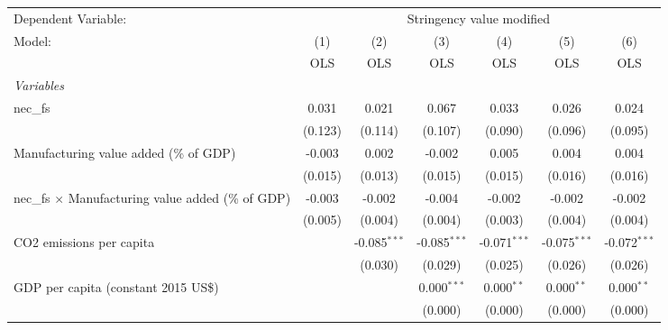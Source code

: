 
\begingroup
\centering
\begin{tabular}{lcccccc}
   \toprule
   Dependent Variable: & \multicolumn{6}{c}{Stringency value modified}\\
   Model:                                                    & (1)     & (2)            & (3)            & (4)            & (5)            & (6)\\  
                                                             &  OLS    & OLS            & OLS            & OLS            & OLS            & OLS\\  
   \midrule
   \emph{Variables}\\
   nec\_fs                                                   & 0.031   & 0.021          & 0.067          & 0.033          & 0.026          & 0.024\\   
                                                             & (0.123) & (0.114)        & (0.107)        & (0.090)        & (0.096)        & (0.095)\\   
   Manufacturing value added (\% of GDP)                     & -0.003  & 0.002          & -0.002         & 0.005          & 0.004          & 0.004\\   
                                                             & (0.015) & (0.013)        & (0.015)        & (0.015)        & (0.016)        & (0.016)\\   
   nec\_fs $\times$ Manufacturing value added (\% of GDP)    & -0.003  & -0.002         & -0.004         & -0.002         & -0.002         & -0.002\\   
                                                             & (0.005) & (0.004)        & (0.004)        & (0.003)        & (0.004)        & (0.004)\\   
   CO2 emissions per capita                                  &         & -0.085$^{***}$ & -0.085$^{***}$ & -0.071$^{***}$ & -0.075$^{***}$ & -0.072$^{***}$\\   
                                                             &         & (0.030)        & (0.029)        & (0.025)        & (0.026)        & (0.026)\\   
   GDP per capita (constant 2015 US\$)                       &         &                & 0.000$^{***}$  & 0.000$^{**}$   & 0.000$^{**}$   & 0.000$^{**}$\\   
                                                             &         &                & (0.000)        & (0.000)        & (0.000)        & (0.000)\\   

\end{tabular}
